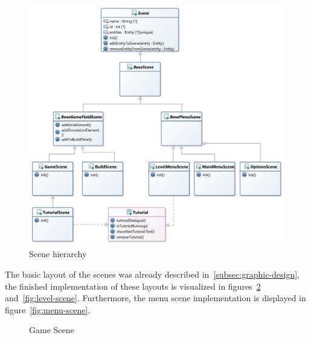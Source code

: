 \begin{figure}
    \centering
    \includegraphics[width=\textwidth]{Pictures/res/implementation/scenes-hierarchy}
    \caption{Scene hierarchy}
    \label{fig:scenes-hierachry}
\end{figure}

The basic layout of the scenes was already described in~\ref{subsec:graphic-design}, the finished implementation of these
layouts is visualized in figures~\ref{fig:game-scene} and~\ref{fig:level-scene}.
Furthermore, the menu scene implementation is displayed in figure~\ref{fig:menu-scene}.
\begin{figure}
    \centering
    \setlength{\fboxsep}{1pt}
    \setlength{\fboxrule}{1pt}
    \caption{Game Scene}
    \label{fig:game-scene}
\end{figure}


